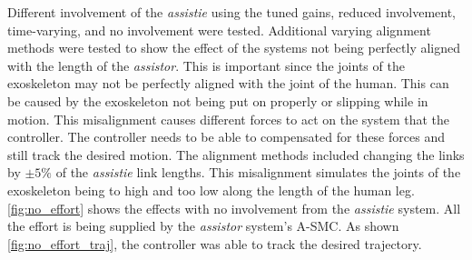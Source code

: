 Different involvement of the \textit{assistie}  using the tuned gains, reduced involvement, time-varying, and no involvement were tested. Additional varying alignment methods were tested to show the effect of the systems not being perfectly aligned with the length of the \textit{assistor}. This is important since the joints of the exoskeleton may not be perfectly aligned with the joint of the human. This can be caused by the exoskeleton not being put on properly or slipping while in motion. This misalignment causes different forces to act on the system that the controller. The controller needs to be able to compensated for these forces and still track the desired motion.  The alignment methods included changing the links by $\pm 5\%$ of the \textit{assistie} link lengths. This misalignment simulates the joints of the exoskeleton being to high and too low along the length of the human leg. \autoref{fig:no_effort} shows the effects with no involvement from the \textit{assistie} system. All the effort is being supplied by the \textit{assistor} system's A-SMC. As shown \autoref{fig:no_effort_traj}, the controller was able to track the desired trajectory. 

